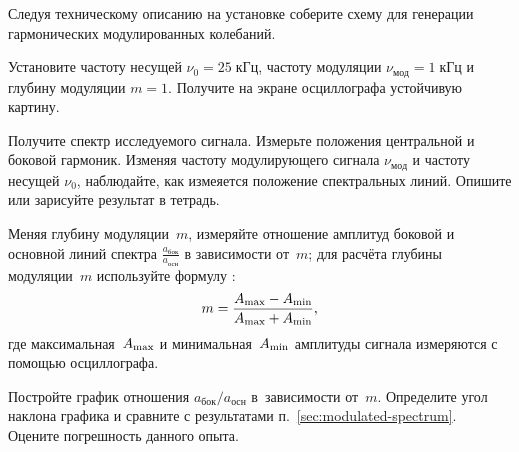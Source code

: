 \begin{lab:task}
\item Следуя техническому описанию на установке соберите схему для
генерации гармонических модулированных колебаний.

\item Установите частоту несущей $\nu_0=25\;кГц$, частоту модуляции
$\nu_{мод} = 1\;кГц$ и глубину модуляции $m=1$.
Получите на экране осциллографа устойчивую картину.

\item Получите спектр исследуемого сигнала. Измерьте положения центральной
и боковой гармоник. Изменяя частоту модулирующего сигнала $\nu_{мод}$
и частоту несущей $\nu_0$, наблюдайте, как измеяется положение спектральных линий.
Опишите или зарисуйте результат в тетрадь.

\item Меняя глубину модуляции~$m$, измеряйте отношение амплитуд
боковой и основной линий спектра $\frac{a_\text{бок}}{a_\text{осн}}$
в зависимости от~$m$;
для расчёта глубины модуляции~$m$ используйте формулу :
\begin{equation*}
    m = \frac{A_{\rm max} - A_{\rm min}}{A_{\rm max} + A_{\rm min}},
\end{equation*}
где максимальная~$A_{\rm max}$ и минимальная~$A_{\rm min}$ амплитуды сигнала
измеряются с помощью осциллографа.

\item Постройте график отношения $a_\text{бок}/a_\text{осн}$
в~зависимости от~$m$. Определите угол наклона графика и сравните
с результатами п.~\ref{sec:modulated-spectrum}. Оцените погрешность данного опыта.

\end{lab:task}





